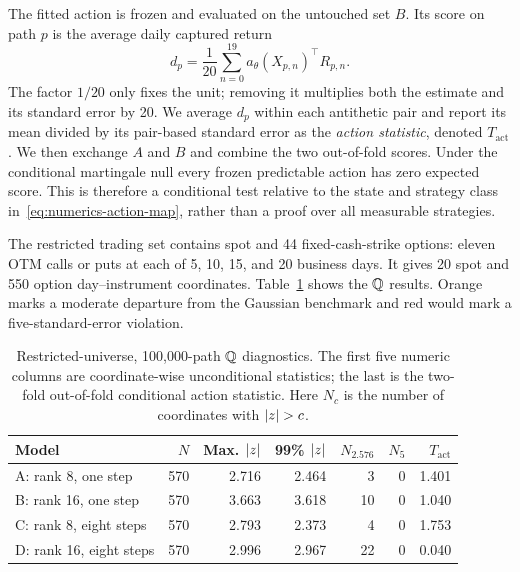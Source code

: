 {The fitted action is frozen and evaluated on the untouched set $B$.  Its score
on path $p$ is the average daily captured return
\begin{equation}\label{eq:numerics-action-path-score}
  d_p=\frac1{20}\sum_{n=0}^{19}a_\theta(X_{p,n})^\top R_{p,n}.
\end{equation}
The factor $1/20$ only fixes the unit; removing it multiplies both the estimate
and its standard error by 20.  We average $d_p$ within each antithetic pair and
report its mean divided by its pair-based standard error as the \emph{action
statistic}, denoted $T_{\mathrm{act}}$.  We then exchange $A$ and $B$ and combine the two out-of-fold
scores.  Under the conditional martingale null every frozen predictable action
has zero expected score.  This is therefore a conditional test relative to the
state and strategy class in~\eqref{eq:numerics-action-map}, rather than a proof
over all measurable strategies.

The restricted trading set contains spot and 44 fixed-cash-strike options:
eleven OTM calls or puts at each of 5, 10, 15, and 20 business days.  It gives
20 spot and 550 option day--instrument coordinates.  Table~\ref{tab:numerics-restricted-q}
shows the $\mathbb Q$ results.  Orange marks a moderate departure from the Gaussian
benchmark and red would mark a five-standard-error violation.

\begin{table}[H]
\centering
\small
\begin{tabular}{lrrrrrr}
\toprule
Model & $N$ & Max. $\lvert z\rvert$ & 99\% $\lvert z\rvert$
  & $N_{2.576}$ & $N_5$ & $T_{\mathrm{act}}$\\
\midrule
A: rank 8, one step    & 570 & 2.716 & 2.464 &  3 & 0 & 1.401\\
B: rank 16, one step   & 570 & {\color{orange}3.663} & {\color{orange}3.618}
  & {\color{orange}10} & 0 & 1.040\\
C: rank 8, eight steps & 570 & 2.793 & 2.373 &  4 & 0 & 1.753\\
D: rank 16, eight steps& 570 & 2.996 & {\color{orange}2.967}
  & {\color{orange}22} & 0 & 0.040\\
\bottomrule
\end{tabular}
\caption{Restricted-universe, 100,000-path $\mathbb Q$ diagnostics.  The first five
numeric columns are coordinate-wise unconditional statistics; the last is the
two-fold out-of-fold conditional action statistic.  Here $N_c$ is the number
of coordinates with $\lvert z\rvert>c$.}
\label{tab:numerics-restricted-q}
\end{table}

}
